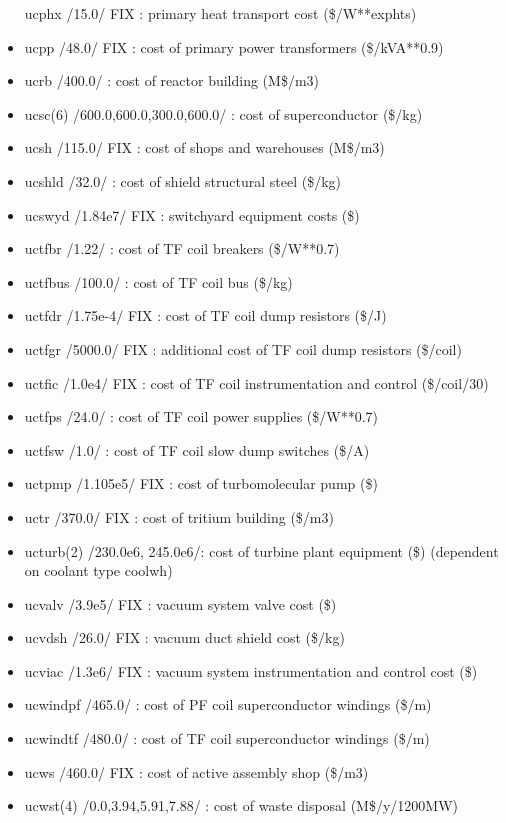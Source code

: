 \documentclass[]{article}
\begin{document}
\begin{itemize}
  ucphx /15.0/ FIX : primary heat transport cost (\$/W**exphts)
\item
  ucpp /48.0/ FIX : cost of primary power transformers (\$/kVA**0.9)
\item
  ucrb /400.0/ : cost of reactor building (M\$/m3)
\item
  ucsc(6) /600.0,600.0,300.0,600.0/ : cost of superconductor (\$/kg)
\item
  ucsh /115.0/ FIX : cost of shops and warehouses (M\$/m3)
\item
  ucshld /32.0/ : cost of shield structural steel (\$/kg)
\item
  ucswyd /1.84e7/ FIX : switchyard equipment costs (\$)
\item
  uctfbr /1.22/ : cost of TF coil breakers (\$/W**0.7)
\item
  uctfbus /100.0/ : cost of TF coil bus (\$/kg)
\item
  uctfdr /1.75e-4/ FIX : cost of TF coil dump resistors (\$/J)
\item
  uctfgr /5000.0/ FIX : additional cost of TF coil dump resistors
  (\$/coil)
\item
  uctfic /1.0e4/ FIX : cost of TF coil instrumentation and control
  (\$/coil/30)
\item
  uctfps /24.0/ : cost of TF coil power supplies (\$/W**0.7)
\item
  uctfsw /1.0/ : cost of TF coil slow dump switches (\$/A)
\item
  uctpmp /1.105e5/ FIX : cost of turbomolecular pump (\$)
\item
  uctr /370.0/ FIX : cost of tritium building (\$/m3)
\item
  ucturb(2) /230.0e6, 245.0e6/: cost of turbine plant equipment (\$)
  (dependent on coolant type coolwh)
\item
  ucvalv /3.9e5/ FIX : vacuum system valve cost (\$)
\item
  ucvdsh /26.0/ FIX : vacuum duct shield cost (\$/kg)
\item
  ucviac /1.3e6/ FIX : vacuum system instrumentation and control cost
  (\$)
\item
  ucwindpf /465.0/ : cost of PF coil superconductor windings (\$/m)
\item
  ucwindtf /480.0/ : cost of TF coil superconductor windings (\$/m)
\item
  ucws /460.0/ FIX : cost of active assembly shop (\$/m3)
\item
  ucwst(4) /0.0,3.94,5.91,7.88/ : cost of waste disposal (M\$/y/1200MW)
\end{itemize}
\end{document}
